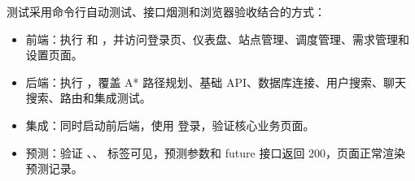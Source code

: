 测试采用命令行自动测试、接口烟测和浏览器验收结合的方式：

\begin{itemize}
  \item 前端：执行  和 ，并访问登录页、仪表盘、站点管理、调度管理、需求管理和设置页面。
  \item 后端：执行 ，覆盖 A* 路径规划、基础 API、数据库连接、用户搜索、聊天搜索、路由和集成测试。
  \item 集成：同时启动前后端，使用  登录，验证核心业务页面。
  \item 预测：验证 、、 标签可见，预测参数和 future 接口返回 200，页面正常渲染预测记录。
\end{itemize}
